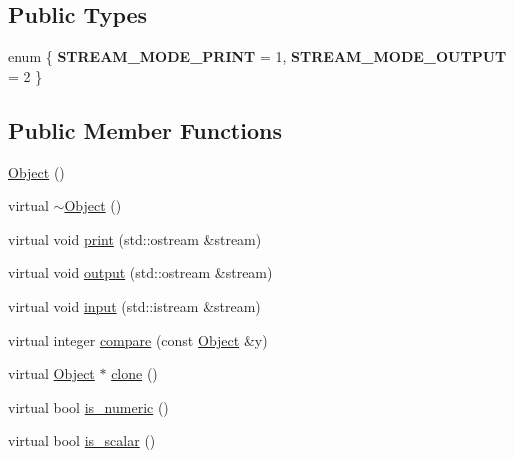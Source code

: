 \subsection*{Public Types}
\begin{DoxyCompactItemize}
\item 
\mbox{\label{classez_1_1objects_1_1Object_ad1ec0b90f18dd3a30399fe3f80af27bb}} 
enum \{ {\bfseries S\+T\+R\+E\+A\+M\+\_\+\+M\+O\+D\+E\+\_\+\+P\+R\+I\+NT} = 1, 
{\bfseries S\+T\+R\+E\+A\+M\+\_\+\+M\+O\+D\+E\+\_\+\+O\+U\+T\+P\+UT} = 2
 \}
\end{DoxyCompactItemize}
\subsection*{Public Member Functions}
\begin{DoxyCompactItemize}
\item 
\hyperlink{classez_1_1objects_1_1Object_a0c3d39046853c0eb87924e0268063175}{Object} ()
\item 
virtual \hyperlink{classez_1_1objects_1_1Object_a4c17ee2010ca61cf917962e2ba6bb5c5}{$\sim$\+Object} ()
\item 
virtual void \hyperlink{classez_1_1objects_1_1Object_a9e20f39a78163f67f000576149d858b3}{print} (std\+::ostream \&stream)
\item 
virtual void \hyperlink{classez_1_1objects_1_1Object_a0fdfe18e6c35d6b0d7e7a01265aded15}{output} (std\+::ostream \&stream)
\item 
virtual void \hyperlink{classez_1_1objects_1_1Object_a878bdc53b7f16fda6fa15dab214c4b6a}{input} (std\+::istream \&stream)
\item 
virtual integer \hyperlink{classez_1_1objects_1_1Object_aca311d389dffa204e425463145f4e1e6}{compare} (const \hyperlink{classez_1_1objects_1_1Object}{Object} \&y)
\item 
virtual \hyperlink{classez_1_1objects_1_1Object}{Object} $\ast$ \hyperlink{classez_1_1objects_1_1Object_acf444b2581d898eb4b8c92c2d5865c9e}{clone} ()
\item 
virtual bool \hyperlink{classez_1_1objects_1_1Object_a19ba1672d4063232c4619e016ca178f8}{is\+\_\+numeric} ()
\item 
virtual bool \hyperlink{classez_1_1objects_1_1Object_a08d51e793285a46e20fb578056052a48}{is\+\_\+scalar} ()
\end{DoxyCompactItemize}
